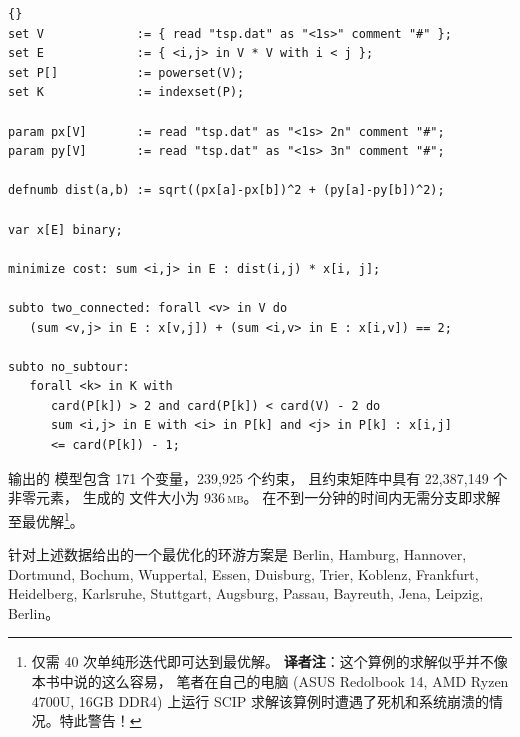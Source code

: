 \medskip
{}
\begin{lstlisting}[frame=tb]{}
set V             := { read "tsp.dat" as "<1s>" comment "#" };
set E             := { <i,j> in V * V with i < j };
set P[]           := powerset(V);
set K             := indexset(P);

param px[V]       := read "tsp.dat" as "<1s> 2n" comment "#";
param py[V]       := read "tsp.dat" as "<1s> 3n" comment "#";

defnumb dist(a,b) := sqrt((px[a]-px[b])^2 + (py[a]-py[b])^2);

var x[E] binary;

minimize cost: sum <i,j> in E : dist(i,j) * x[i, j];

subto two_connected: forall <v> in V do
   (sum <v,j> in E : x[v,j]) + (sum <i,v> in E : x[i,v]) == 2;

subto no_subtour:
   forall <k> in K with
      card(P[k]) > 2 and card(P[k]) < card(V) - 2 do
      sum <i,j> in E with <i> in P[k] and <j> in P[k] : x[i,j]
      <= card(P[k]) - 1;
\end{lstlisting}

\medskip
\noindent 输出的 \lp 模型包含 171 个变量，239,925 个约束，
且约束矩阵中具有 22,387,149 个非零元素，
生成的 \mps 文件大小为 936\,\textsc{mb}。
\cplex 在不到一分钟的时间内无需分支即求解至最优解\footnote{
  仅需 40 次单纯形迭代即可达到最优解。
  \textbf{译者注}：这个算例的求解似乎并不像本书中说的这么容易，
  笔者在自己的电脑 (ASUS Redolbook 14, AMD Ryzen 4700U, 16GB DDR4)
  上运行 SCIP 求解该算例时遭遇了死机和系统崩溃的情况。特此警告！
}。

针对上述数据给出的一个最优化的环游方案是
Berlin, Hamburg, Hannover, Dortmund, Bo\-chum, Wuppertal, Essen,
Duisburg, Trier, Koblenz, Frankfurt, Heidelberg, Karlsruhe, Stuttgart,
Augsburg, Passau, Bayreuth, Jena, Leipzig, Berlin。


